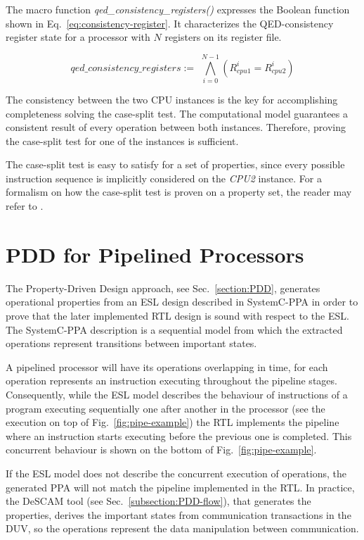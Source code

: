 The macro function \textit{qed\_consistency\_registers()} expresses the Boolean function shown in Eq.~\ref{eq:consistency-register}. It characterizes the QED-consistency register state for a processor with $N$ registers on its register file.

\begin{equation}
    qed\_consistency\_registers := \,\, \bigwedge_{i = 0}^{N-1} \left(R^i_{cpu1} = R^i_{cpu2}\right)
    \label{eq:consistency-register}
\end{equation}

The consistency between the two CPU instances is the key for accomplishing completeness solving the case-split test. The \SSQED{} computational model guarantees a consistent result of every operation between both instances. Therefore, proving the case-split test for one of the instances is sufficient.

The case-split test is easy to satisfy for a set of \SSQED{} properties, since every possible instruction sequence is implicitly considered on the \textit{CPU2} instance. For a formalism on how the case-split test is proven on a \SSQED{} property set, the reader may refer to \cite{paper-gapfree}.

\section{PDD for Pipelined Processors}
\label{section:pdd-pipe-processor}

The Property-Driven Design approach, see Sec.~\ref{section:PDD}, generates operational properties from an ESL design described in SystemC-PPA in order to prove that the later implemented RTL design is sound with respect to the ESL. The SystemC-PPA description is a sequential model from which the extracted operations represent transitions between important states. 

A pipelined processor will have its operations overlapping in time, for each operation represents an instruction executing throughout the pipeline stages. Consequently, while the ESL model describes the behaviour of instructions of a program executing sequentially one after another in the processor (see the execution on top of Fig.~\ref{fig:pipe-example}) the RTL implements the pipeline where an instruction starts executing before the previous one is completed. This concurrent behaviour is shown on the bottom of Fig.~\ref{fig:pipe-example}.

If the ESL model does not describe the concurrent execution of operations, the generated PPA will not match the pipeline implemented in the RTL. In practice, the DeSCAM tool (see Sec.~\ref{subsection:PDD-flow}), that generates the properties, derives the important states from communication transactions in the DUV, so the operations represent the data manipulation between communication. 

